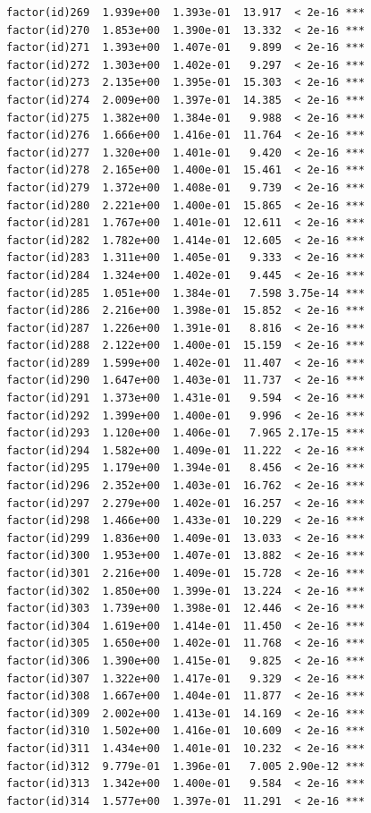 \documentclass[]{book}
\begin{document}
\begin{verbatim}
factor(id)269  1.939e+00  1.393e-01  13.917  < 2e-16 ***
factor(id)270  1.853e+00  1.390e-01  13.332  < 2e-16 ***
factor(id)271  1.393e+00  1.407e-01   9.899  < 2e-16 ***
factor(id)272  1.303e+00  1.402e-01   9.297  < 2e-16 ***
factor(id)273  2.135e+00  1.395e-01  15.303  < 2e-16 ***
factor(id)274  2.009e+00  1.397e-01  14.385  < 2e-16 ***
factor(id)275  1.382e+00  1.384e-01   9.988  < 2e-16 ***
factor(id)276  1.666e+00  1.416e-01  11.764  < 2e-16 ***
factor(id)277  1.320e+00  1.401e-01   9.420  < 2e-16 ***
factor(id)278  2.165e+00  1.400e-01  15.461  < 2e-16 ***
factor(id)279  1.372e+00  1.408e-01   9.739  < 2e-16 ***
factor(id)280  2.221e+00  1.400e-01  15.865  < 2e-16 ***
factor(id)281  1.767e+00  1.401e-01  12.611  < 2e-16 ***
factor(id)282  1.782e+00  1.414e-01  12.605  < 2e-16 ***
factor(id)283  1.311e+00  1.405e-01   9.333  < 2e-16 ***
factor(id)284  1.324e+00  1.402e-01   9.445  < 2e-16 ***
factor(id)285  1.051e+00  1.384e-01   7.598 3.75e-14 ***
factor(id)286  2.216e+00  1.398e-01  15.852  < 2e-16 ***
factor(id)287  1.226e+00  1.391e-01   8.816  < 2e-16 ***
factor(id)288  2.122e+00  1.400e-01  15.159  < 2e-16 ***
factor(id)289  1.599e+00  1.402e-01  11.407  < 2e-16 ***
factor(id)290  1.647e+00  1.403e-01  11.737  < 2e-16 ***
factor(id)291  1.373e+00  1.431e-01   9.594  < 2e-16 ***
factor(id)292  1.399e+00  1.400e-01   9.996  < 2e-16 ***
factor(id)293  1.120e+00  1.406e-01   7.965 2.17e-15 ***
factor(id)294  1.582e+00  1.409e-01  11.222  < 2e-16 ***
factor(id)295  1.179e+00  1.394e-01   8.456  < 2e-16 ***
factor(id)296  2.352e+00  1.403e-01  16.762  < 2e-16 ***
factor(id)297  2.279e+00  1.402e-01  16.257  < 2e-16 ***
factor(id)298  1.466e+00  1.433e-01  10.229  < 2e-16 ***
factor(id)299  1.836e+00  1.409e-01  13.033  < 2e-16 ***
factor(id)300  1.953e+00  1.407e-01  13.882  < 2e-16 ***
factor(id)301  2.216e+00  1.409e-01  15.728  < 2e-16 ***
factor(id)302  1.850e+00  1.399e-01  13.224  < 2e-16 ***
factor(id)303  1.739e+00  1.398e-01  12.446  < 2e-16 ***
factor(id)304  1.619e+00  1.414e-01  11.450  < 2e-16 ***
factor(id)305  1.650e+00  1.402e-01  11.768  < 2e-16 ***
factor(id)306  1.390e+00  1.415e-01   9.825  < 2e-16 ***
factor(id)307  1.322e+00  1.417e-01   9.329  < 2e-16 ***
factor(id)308  1.667e+00  1.404e-01  11.877  < 2e-16 ***
factor(id)309  2.002e+00  1.413e-01  14.169  < 2e-16 ***
factor(id)310  1.502e+00  1.416e-01  10.609  < 2e-16 ***
factor(id)311  1.434e+00  1.401e-01  10.232  < 2e-16 ***
factor(id)312  9.779e-01  1.396e-01   7.005 2.90e-12 ***
factor(id)313  1.342e+00  1.400e-01   9.584  < 2e-16 ***
factor(id)314  1.577e+00  1.397e-01  11.291  < 2e-16 ***

\end{verbatim}
\end{document}
